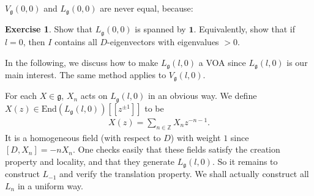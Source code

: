 \documentclass[11pt,b5paper,notitlepage]{article}
\theoremstyle{definition}
\newtheorem{exe}[df]{Exercise}
\theoremstyle{plain}
\newcommand{\End}{\mathrm{End}} %
\newcommand{\id}{\mathbf{1}}
\newcommand{\gk}{\mathfrak g}
\newcommand{\Zbb}{\mathbb Z}
\numberwithin{equation}{section}
\begin{document}
$V_\gk(0,0)$ and $L_\gk(0,0)$ are never equal, because:
\begin{exe}
Show that $L_\gk(0,0)$ is spanned by $\id$. Equivalently, show that if $l=0$, then $I$ contains all $D$-eigenvectors with eigenvalues $>0$.
\end{exe}


In the following, we discuss how to make $L_\gk(l,0)$ a VOA since $L_\gk(l,0)$ is our main interest. The same method applies to $V_\gk(l,0)$.



For each $X\in\gk$, $X_n$ acts on $L_\gk(l,0)$ in an obvious way. We define $X(z)\in\End(L_\gk(l,0))[[z^{\pm1}]]$ to be
\begin{align*}
	X(z)=\sum_{n\in\Zbb}X_nz^{-n-1}.
\end{align*}
It is a homogeneous field (with respect to $D$) with weight $1$ since $[D,X_n]=-nX_n$. One checks easily that these fields satisfy the creation property and locality, and that they  generate $L_\gk(l,0)$. So it remains to construct $L_{-1}$ and verify the translation property. We shall actually construct all $L_n$ in a uniform way.




\subsection{}
\end{document}
